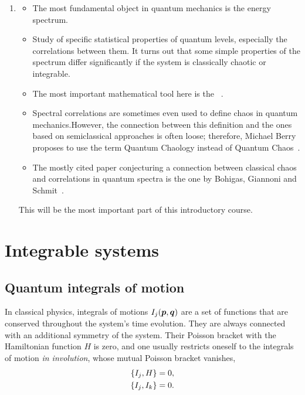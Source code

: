 \documentclass[a4paper,11pt,twoside]{article}
\begin{document}
\begin{enumerate}
                \item {}
                    \begin{itemize}
                        \item The most fundamental object in quantum mechanics is the energy spectrum.
                        \item Study of specific statistical properties of quantum levels, especially the correlations between them.
                        It turns out that some simple properties of the spectrum differ significantly if the system is classically chaotic or integrable.
                        \item The most important mathematical tool here is the ~\cite{Meh04}.
                        \item Spectral correlations are sometimes even used to define chaos in quantum mechanics.How\-ever, the connection between this definition and the ones based on semiclassical approaches is often loose; therefore, Michael Berry proposes to use the term Quantum Chaology instead of Quantum Chaos~\cite{Ber89}.
                        \item The mostly cited paper conjecturing a connection between classical chaos and correlations in quantum spectra is the one by Bohigas, Giannoni and Schmit~\cite{Boh84}.
                    \end{itemize}
                    This will be the most important part of this introductory course.
        \end{enumerate}

\section{Integrable systems}\label{sec:Integrable}
    \subsection{Quantum integrals of motion}
        In classical physics, integrals of motions $I_j(\boldsymbol{p},\boldsymbol{q})$ are a set of functions that are conserved throughout the system's time evolution.
        They are always connected with an additional symmetry of the system.
        Their Poisson bracket with the Hamiltonian function $H$ is zero, and one usually restricts oneself to the integrals of motion \emph{in involution}, whose mutual Poisson bracket vanishes,
        \begin{align}
            \left\{{I_{j}},{H}\right\}=0,\nonumber\\
            \left\{{I_{j}},{I_{k}}\right\}=0.
        \end{align}
        
\end{document}

